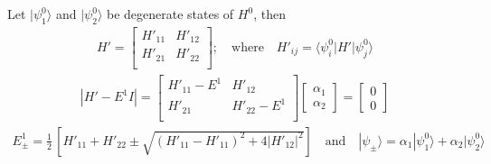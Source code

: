 Let $| \psi_1^0 \rangle$ and $| \psi_2^0 \rangle$ be degenerate states of $H^0$, then
\begin{align}
    H' = \begin{bmatrix}
        H'_{11} & H'_{12} \\
        H'_{21} & H'_{22} \\
    \end{bmatrix}; \quad \text{where} \quad
    H'_{ij} = \langle \psi_i^0 | H' | \psi_j^0 \rangle
\end{align}
\begin{align}
    | H' - E^1 I | = \begin{bmatrix}
        H'_{11} - E^1 & H'_{12} \\
        H'_{21} & H'_{22} - E^1 \\
    \end{bmatrix} \begin{bmatrix}
        \alpha_1 \\
        \alpha_2
    \end{bmatrix} = \begin{bmatrix}
        0 \\ 0
    \end{bmatrix}
\end{align}
\begin{align}
    E^1_\pm = \frac{1}{2}\, \left[ H'_{11} + H'_{22} \pm \sqrt{(H'_{11}-H'_{11})^2 + 4|H'_{12}|^2} \right]
    \quad \text{and} \quad |\psi_\pm \rangle = \alpha_1 |\psi_1^0 \rangle + \alpha_2 |\psi_2^0 \rangle
\end{align}
